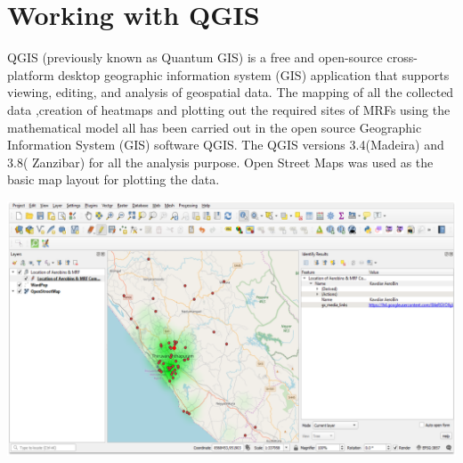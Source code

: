 \documentclass[12pt,a4paper]{  report}
\begin{document}
\section{Working with QGIS} %
\begin{justify}
	QGIS (previously known as Quantum GIS) is a free and open-source cross-platform desktop geographic information system (GIS) application that supports viewing, editing, and analysis of geospatial data.
	The mapping of all the collected data ,creation of heatmaps and plotting out the required sites of MRFs using the mathematical model all has been carried out in the open source Geographic Information System (GIS)  software QGIS.
	The QGIS versions 3.4(Madeira) and 3.8( Zanzibar) for all the analysis purpose.
	Open Street Maps was used as the basic map layout for plotting the data. 
	
	\includegraphics[width=1\textwidth]{qgis_ui}
\end{justify}
	
\end{document}
